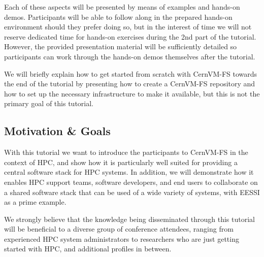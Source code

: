Each of these aspects will be presented by means of examples and hands-on demos.
Participants will be able to follow along in the prepared hands-on environment should they prefer doing so,
but in the interest of time we will not reserve dedicated time for
hands-on exercises during the 2nd part of the tutorial. However, the provided presentation material
will be sufficiently detailed so participants can work through the hands-on demos themselves after the tutorial.

We will briefly explain how to get started from scratch with CernVM-FS towards the end of the tutorial by presenting
how to create a CernVM-FS repository and how to set up the necessary infrastructure to make it available,
but this is not the primary goal of this tutorial.

\subsection*{Motivation \& Goals}

With this tutorial we want to introduce the participants to CernVM-FS in the context of HPC,
and show how it is particularly well suited for providing a central software stack for HPC systems.
In addition, we will demonstrate how it enables HPC support teams, software developers, and end users to
collaborate on a shared software stack that can be used of a wide variety of systems, with EESSI as a prime example.

We strongly believe that the knowledge being disseminated through this tutorial will be beneficial
to a diverse group of conference attendees, ranging from experienced HPC system administrators to researchers
who are just getting started with HPC, and additional profiles in between.





